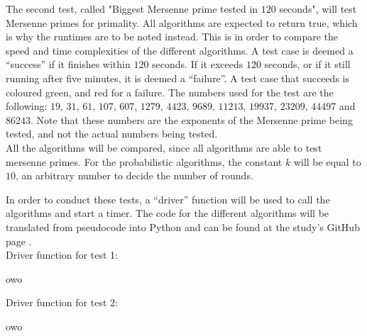 \documentclass[main.tex]{subfiles}
\begin{document}
The second test, called "Biggest Mersenne prime tested in $120$ seconds", will
test Mersenne primes for primality. All algorithms are expected to return true,
which is why the runtimes are to be noted instead. This is in order to compare
the speed and time complexities of the different algorithms. A test case is
deemed a ``success'' if it finishes within $120$ seconds. If it exceeds $120$
seconds, or if it still running after five minutes, it is deemed a ``failure''.
A test case that succeeds is coloured green, and red for a failure. The
numbers used for the test are the following: $19$, $31$, $61$, $107$, $607$,
$1279$, $4423$, $9689$, $11213$, $19937$, $23209$, $44497$ and $86243$. Note
that these numbers are the exponents of the Mersenne prime being tested, and not
the actual numbers being tested. \\

All the algorithms will be compared, since all algorithms are able to test
mersenne primes. For the probabilistic algorithms, the constant $k$ will be
equal to $10$, an arbitrary number to decide the number of rounds. \newline

In order to conduct these tests, a ``driver'' function will be used to call the
algorithms and start a timer. The code for the different algorithms will be
translated from pseudocode into Python and can be found at the study's GitHub
page \cite{github}. \\

Driver function for test 1:

\begin{python}
  owo
\end{python}

\vspace{5mm}

Driver function for test 2:

\begin{python}
  owo
\end{python}
\end{document}
